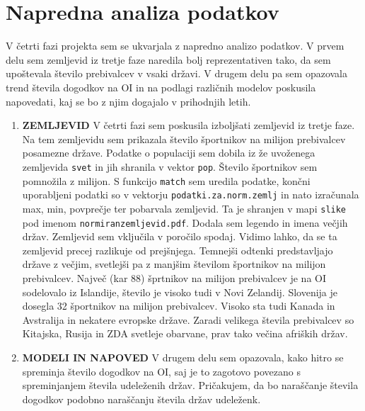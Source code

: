 \documentclass[11pt,a4paper]{article}
\begin{document}
\section{Napredna analiza podatkov}
V četrti fazi projekta sem se ukvarjala z napredno analizo podatkov. V prvem delu sem zemljevid iz tretje faze naredila bolj reprezentativen tako, da sem upoštevala število prebivalcev v vsaki državi. V drugem delu pa sem opazovala trend števila dogodkov na OI in na podlagi različnih modelov poskusila napovedati, kaj se bo z njim dogajalo v prihodnjih letih.
\newline
\begin{enumerate}
\item{\textbf{ZEMLJEVID}
\newline
V četrti fazi sem poskusila izboljšati zemljevid iz tretje faze. Na tem zemljevidu sem prikazala število športnikov na milijon prebivalcev posamezne države. Podatke o populaciji sem dobila iz že uvoženega zemljevida \verb|svet| in jih shranila v vektor \verb|pop|. Število športnikov sem pomnožila z milijon. S funkcijo \verb|match| sem uredila podatke, končni uporabljeni podatki so v vektorju \verb|podatki.za.norm.zemlj| in nato izračunala max, min, povprečje ter pobarvala zemljevid. Ta je shranjen v mapi \verb|slike| pod imenom \verb|normiranzemljevid.pdf|. Dodala sem legendo in imena večjih držav. Zemljevid sem vključila v poročilo spodaj.
\newline
Vidimo lahko, da se ta zemljevid precej razlikuje od prejšnjega. Temnejši odtenki predstavljajo države z večjim, svetlejši pa z manjšim številom športnikov na milijon prebivalcev. Največ (kar 88) šprtnikov na milijon prebivalcev je na OI sodelovalo iz Islandije, število je visoko tudi v Novi Zelandij. Slovenija je dosegla 32 športnikov na milijon prebivalcev. Visoko sta tudi Kanada in Avstralija in nekatere evropske države. Zaradi velikega števila prebivalcev so Kitajska, Rusija in ZDA svetleje obarvane, prav tako večina afriških držav.
}
\newpage
\item{\textbf{MODELI IN NAPOVED}
\newline
V drugem delu sem opazovala, kako hitro se spreminja število dogodkov na OI, saj je to zagotovo povezano s spreminjanjem števila udeleženih držav. Pričakujem, da bo naraščanje števila dogodkov podobno naraščanju števila držav udeleženk.
\newline
}
\end{enumerate}
\end{document}
